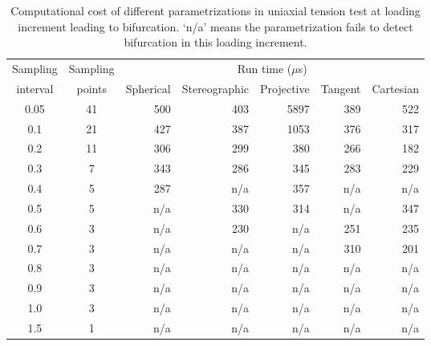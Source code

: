 \documentclass[12pt]{article}
\numberwithin{equation}{section}
\begin{document}
\begin{table}[H]
  \begin{center}
    \begin{tabular}{c c | r r r r r}
      \toprule
      Sampling   & Sampling &   \multicolumn{5}{c}{Run time ($\mu$s)}	\\   
      interval     & points     &  Spherical    &   Stereographic  &   Projective  &   Tangent   & Cartesian  \\
      \midrule         
      0.05      &      41     &      500     &    403       &       5897       &       389        &      522           \\
      0.1        &      21     &      427     &    387       &       1053       &       376        &      317           \\
      0.2        &      11     &      306     &    299       &       380         &       266        &      182           \\
      0.3        &      7       &      343     &    286       &       345         &       283        &      229           \\
      0.4        &      5       &      287     &    n/a        &       357         &       n/a         &      n/a            \\       
      0.5        &      5       &	  n/a      &    330       &       314         &       n/a         &      347           \\
      0.6        &      3       &	  n/a      &    230       &       n/a          &       251        &      235           \\
      0.7        &      3       &	  n/a      &    n/a 	     &       n/a          &       310        &      201            \\
      0.8        &      3       &      n/a      &    n/a        &       n/a          &       n/a         &       n/a            \\	      
      0.9        &      3       &	  n/a      &    n/a        &       n/a          &       n/a         &       n/a           \\	
      1.0        &      3       &      n/a      &    n/a	     &       n/a          &       n/a         &       n/a          \\	
      1.5        &      1       &	  n/a      &    n/a	     &       n/a          &       n/a         &       n/a          \\	     
      \bottomrule
    \end{tabular}
    \caption{Computational cost of different parametrizations in 
    uniaxial tension test at loading increment leading to bifurcation. 
    `n/a' means the parametrization fails to detect bifurcation in 
    this loading increment.}
    \label{tab:aniso_uniaxial_runtime}
  \end{center}
\end{table}
\end{document}
